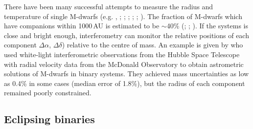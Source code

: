 There have been many successful attempts to measure the radius and temperature of single M-dwarfs (e.g. \citealt{1997A&A...325..159L}, \citealt{2006ApJ...644..475B}; \citealt{2001AAS...198.5120N}; \citealt{2003A&A...397L...5S}; \citealt{2009A&A...505..205D};  \citealt{2012ApJ...757..112B}; \citealt{2015csss...18..839V}). The fraction of M-dwarfs which have companions within 1000\,AU is estimated to be $\sim$40\% (\citealt{1992ApJ...396..178F}; \citealt{2006ApJ...640L..63L}; \citealt{2010ApJS..190....1R}). If the systems is close and bright enough, interferometry can monitor the relative positions of each component $\Delta \alpha$, $\Delta \delta$) relative to the centre of mass. An example is given by \citet{2016AJ....152..141B} who used white-light interferometric observations from the Hubble Space Telescope with radial velocity data from the McDonald Observatory to obtain astrometric solutions of M-dwarfs in binary systems. They achieved mass uncertainties as low as 0.4\% in some cases (median error of 1.8\%), but the radius of each component remained poorly constrained.




\subsection{Eclipsing binaries}


